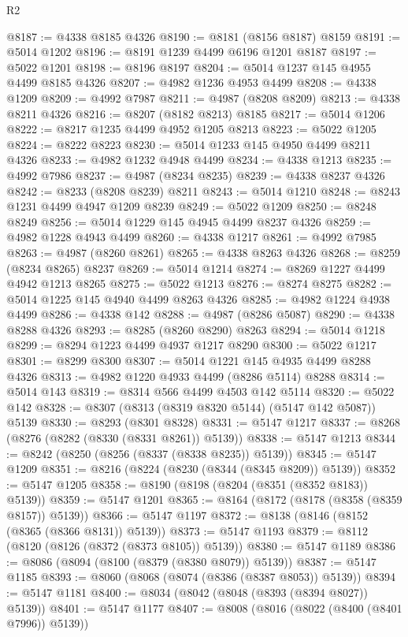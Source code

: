 \begin{lexlean}{R2}
\begin{coremodule}
@8187 := @4338 @8185 @4326
@8190 := @8181 (@8156 @8187) @8159
@8191 := @5014 @1202
@8196 := @8191 @1239 @4499 @6196 @1201 @8187
@8197 := @5022 @1201
@8198 := @8196 @8197
@8204 := @5014 @1237 @145 @4955 @4499 @8185 @4326
@8207 := @4982 @1236 @4953 @4499
@8208 := @4338 @1209
@8209 := @4992 @7987
@8211 := @4987 (@8208 @8209)
@8213 := @4338 @8211 @4326
@8216 := @8207 (@8182 @8213) @8185
@8217 := @5014 @1206
@8222 := @8217 @1235 @4499 @4952 @1205 @8213
@8223 := @5022 @1205
@8224 := @8222 @8223
@8230 := @5014 @1233 @145 @4950 @4499 @8211 @4326
@8233 := @4982 @1232 @4948 @4499
@8234 := @4338 @1213
@8235 := @4992 @7986
@8237 := @4987 (@8234 @8235)
@8239 := @4338 @8237 @4326
@8242 := @8233 (@8208 @8239) @8211
@8243 := @5014 @1210
@8248 := @8243 @1231 @4499 @4947 @1209 @8239
@8249 := @5022 @1209
@8250 := @8248 @8249
@8256 := @5014 @1229 @145 @4945 @4499 @8237 @4326
@8259 := @4982 @1228 @4943 @4499
@8260 := @4338 @1217
@8261 := @4992 @7985
@8263 := @4987 (@8260 @8261)
@8265 := @4338 @8263 @4326
@8268 := @8259 (@8234 @8265) @8237
@8269 := @5014 @1214
@8274 := @8269 @1227 @4499 @4942 @1213 @8265
@8275 := @5022 @1213
@8276 := @8274 @8275
@8282 := @5014 @1225 @145 @4940 @4499 @8263 @4326
@8285 := @4982 @1224 @4938 @4499
@8286 := @4338 @142
@8288 := @4987 (@8286 @5087)
@8290 := @4338 @8288 @4326
@8293 := @8285 (@8260 @8290) @8263
@8294 := @5014 @1218
@8299 := @8294 @1223 @4499 @4937 @1217 @8290
@8300 := @5022 @1217
@8301 := @8299 @8300
@8307 := @5014 @1221 @145 @4935 @4499 @8288 @4326
@8313 := @4982 @1220 @4933 @4499 (@8286 @5114) @8288
@8314 := @5014 @143
@8319 := @8314 @566 @4499 @4503 @142 @5114
@8320 := @5022 @142
@8328 := @8307 (@8313 (@8319 @8320 @5144) (@5147 @142 @5087)) @5139
@8330 := @8293 (@8301 @8328)
@8331 := @5147 @1217
@8337 := @8268 (@8276 (@8282 (@8330 (@8331 @8261)) @5139))
@8338 := @5147 @1213
@8344 := @8242 (@8250 (@8256 (@8337 (@8338 @8235)) @5139))
@8345 := @5147 @1209
@8351 := @8216 (@8224 (@8230 (@8344 (@8345 @8209)) @5139))
@8352 := @5147 @1205
@8358 := @8190 (@8198 (@8204 (@8351 (@8352 @8183)) @5139))
@8359 := @5147 @1201
@8365 := @8164 (@8172 (@8178 (@8358 (@8359 @8157)) @5139))
@8366 := @5147 @1197
@8372 := @8138 (@8146 (@8152 (@8365 (@8366 @8131)) @5139))
@8373 := @5147 @1193
@8379 := @8112 (@8120 (@8126 (@8372 (@8373 @8105)) @5139))
@8380 := @5147 @1189
@8386 := @8086 (@8094 (@8100 (@8379 (@8380 @8079)) @5139))
@8387 := @5147 @1185
@8393 := @8060 (@8068 (@8074 (@8386 (@8387 @8053)) @5139))
@8394 := @5147 @1181
@8400 := @8034 (@8042 (@8048 (@8393 (@8394 @8027)) @5139))
@8401 := @5147 @1177
@8407 := @8008 (@8016 (@8022 (@8400 (@8401 @7996)) @5139))

\end{coremodule}
\end{lexlean}

